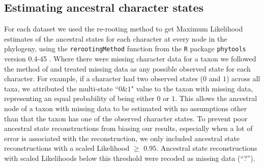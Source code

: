 \documentclass[12pt,a4paper]{article}
\begin{document}
\subsection{Estimating ancestral character states}
\label{ace}
For each dataset we used the re-rooting method \citep{Yang01121995,Garland2000} to get Maximum Likelihood estimates of the ancestral states for each character at every node in the phylogeny, using the \texttt{rerootingMethod} function from the \texttt{R} package \texttt{phytools} version 0.4-45 \citep{phytools,R}. %
Where there were missing character data for a taxon we followed the method of \cite{Claddis} and treated missing data as any possible observed state for each character.
For example, if a character had two observed states ($0$ and $1$) across all taxa, we attributed the multi-state ``$0$\&$1$" value to the taxon with missing data, representing an equal probability of being either $0$ or $1$.
This allows the ancestral node of a taxon with missing data to be estimated with no assumptions other than that the taxon has one of the observed character states.
To prevent poor ancestral state reconstructions from biasing our results, especially when a lot of error is associated with the reconstruction, we only included ancestral state reconstructions with a scaled Likelihood $\geq$ $0.95$.
Ancestral state reconstructions with scaled Likelihoods below this threshold were recoded as missing data (``?'').
\end{document}
